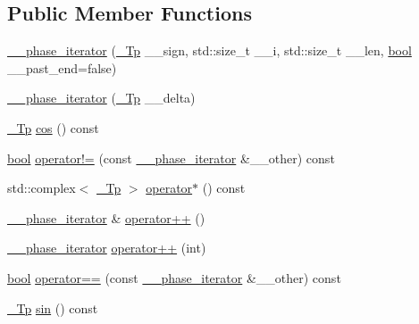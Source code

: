 \subsection*{Public Member Functions}
\begin{DoxyCompactItemize}
\item 
\hyperlink{class____gnu__cxx_1_1____phase__iterator_af39f5fc7df3ea01a383f9bc7345b2330}{\+\_\+\+\_\+phase\+\_\+iterator} (\hyperlink{namespace____gnu__cxx_a3b19a9c800ca194374ef9172290f7d79}{\+\_\+\+Tp} \+\_\+\+\_\+sign, std\+::size\+\_\+t \+\_\+\+\_\+i, std\+::size\+\_\+t \+\_\+\+\_\+len, \hyperlink{namespace____gnu__cxx_ae83aca57f97767d5d09188718728a0ac}{bool} \+\_\+\+\_\+past\+\_\+end=false)
\item 
\hyperlink{class____gnu__cxx_1_1____phase__iterator_af8e0ad92d27e66a746106603aafe9115}{\+\_\+\+\_\+phase\+\_\+iterator} (\hyperlink{namespace____gnu__cxx_a3b19a9c800ca194374ef9172290f7d79}{\+\_\+\+Tp} \+\_\+\+\_\+delta)
\item 
\hyperlink{namespace____gnu__cxx_a3b19a9c800ca194374ef9172290f7d79}{\+\_\+\+Tp} \hyperlink{class____gnu__cxx_1_1____phase__iterator_a4a6cbe9737e8073a586c35d355a89cca}{cos} () const
\item 
\hyperlink{namespace____gnu__cxx_ae83aca57f97767d5d09188718728a0ac}{bool} \hyperlink{class____gnu__cxx_1_1____phase__iterator_ad66a70010229f4a0fe2cea225d59405e}{operator!=} (const \hyperlink{class____gnu__cxx_1_1____phase__iterator}{\+\_\+\+\_\+phase\+\_\+iterator} \&\+\_\+\+\_\+other) const
\item 
std\+::complex$<$ \hyperlink{namespace____gnu__cxx_a3b19a9c800ca194374ef9172290f7d79}{\+\_\+\+Tp} $>$ \hyperlink{class____gnu__cxx_1_1____phase__iterator_afdc5bcce2768619f94cd8da8d0be2a75}{operator$\ast$} () const
\item 
\hyperlink{class____gnu__cxx_1_1____phase__iterator}{\+\_\+\+\_\+phase\+\_\+iterator} \& \hyperlink{class____gnu__cxx_1_1____phase__iterator_a8ef453c6297641600aeacbbeb69e1525}{operator++} ()
\item 
\hyperlink{class____gnu__cxx_1_1____phase__iterator}{\+\_\+\+\_\+phase\+\_\+iterator} \hyperlink{class____gnu__cxx_1_1____phase__iterator_acb438f7faf5843bd8060214874bdcd81}{operator++} (int)
\item 
\hyperlink{namespace____gnu__cxx_ae83aca57f97767d5d09188718728a0ac}{bool} \hyperlink{class____gnu__cxx_1_1____phase__iterator_a8c60a48f50a1646d06c54507ddd6c2b2}{operator==} (const \hyperlink{class____gnu__cxx_1_1____phase__iterator}{\+\_\+\+\_\+phase\+\_\+iterator} \&\+\_\+\+\_\+other) const
\item 
\hyperlink{namespace____gnu__cxx_a3b19a9c800ca194374ef9172290f7d79}{\+\_\+\+Tp} \hyperlink{class____gnu__cxx_1_1____phase__iterator_aaf464df540423bc4d451ca55a93bd9d7}{sin} () const
\end{DoxyCompactItemize}


